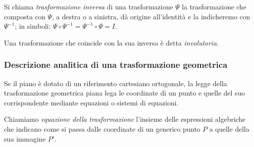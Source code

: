 \begin{definizione}
Si chiama \emph{trasformazione inversa} di una trasformazione $\Psi$ 
la trasformazione che composta con $\Psi$, a destra o a sinistra, dà 
origine all'identità e la indicheremo con $\Psi^{-1}$; in simboli: 
$\Psi \circ \Psi^{-1} = \Psi^{-1} \circ \Psi = I$.
\end{definizione}
      
\begin{definizione}
Una trasformazione che coincide con la sua inversa è detta 
\emph{involutoria}.
\end{definizione}

\subsubsection{\textbf{Descrizione analitica di una trasformazione geometrica}}
Se il piano è dotato di un riferimento cartesiano ortogonale, la 
legge della trasformazione geometrica piana lega le coordinate di un 
punto e quelle del suo corrispondente mediante equazioni o sistemi di 
equazioni.

\begin{definizione}
  Chiamiamo \emph{equazione della trasformazione} l'insieme delle 
  espressioni algebriche che indicano come si passa dalle coordinate di 
  un generico punto $P$ a quelle della sua immagine $P'$.
\end{definizione}

